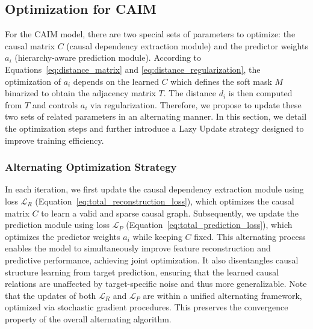 \documentclass[sigconf, nonacm]{acmart}
\newcommand{\icde}[1]{{\color{black}#1}}
\newcommand{\rlend}[1]{{\color{black}#1}}
\newcommand{\syadd}[1]{{\color{black}#1}}
\newcommand{\syfix}[1]{{\color{black}#1}}
\newcommand{\syne}[1]{{\color{black}#1}}
\newcommand*{\ourmodel}{CAIM}
\begin{document}
\subsection{Optimization for \ourmodel{}}
\rlend{
For the \ourmodel{} model, there are two \syne{special} sets of parameters to optimize: the causal matrix $C$ (\icde{causal dependency extraction module}) and the predictor weights $a_i$ (\icde{hierarchy-aware prediction module}). 
According to Equations~\ref{eq:distance_matrix} and \ref{eq:distance_regularization}, the optimization of $a_i$ depends on the learned $C$
\syfix{
which defines the soft mask $M$ binarized to obtain the adjacency matrix $T$. 
The distance $d_i$ is then computed from $T$ and controls $a_i$ via regularization.
} 
Therefore, we propose to update these two sets of related parameters in an alternating manner.
}
\syadd{
In this section, we detail the optimization steps and further introduce a Lazy Update strategy designed to improve training efficiency.
}

\subsubsection{Alternating Optimization Strategy}
In each iteration, we first update the causal dependency extraction module using loss $\mathcal{L}_R$ (Equation~\ref{eq:total_reconstruction_loss}), which optimizes the causal matrix $C$ to learn a valid and sparse causal graph. 
Subsequently, we update the prediction module using loss $\mathcal{L}_P$ (Equation~\ref{eq:total_prediction_loss}), which optimizes the predictor weights $a_i$ while keeping $C$ fixed.  
\syadd{This alternating process enables the model to simultaneously improve feature reconstruction and predictive performance, achieving joint optimization. It also disentangles causal structure learning from target prediction, ensuring that the learned causal relations are unaffected by target-specific noise and thus more generalizable.}
\icde{
Note that the updates of both $\mathcal{L}_R$ and $\mathcal{L}_P$ are within a unified alternating framework, optimized via stochastic gradient procedures.
This preserves the convergence property of the overall alternating algorithm. 
}
    
\end{document}
